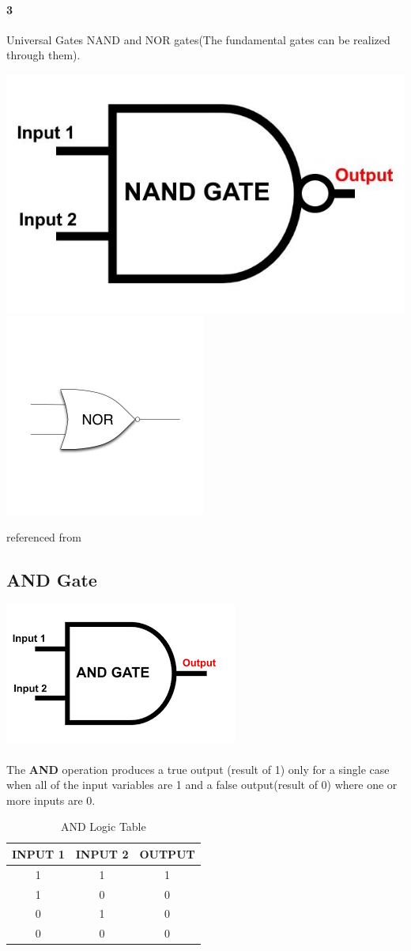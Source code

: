 \documentclass{article}
\begin{document}
		\paragraph{3}
		Universal Gates NAND and NOR gates(The fundamental gates can be realized through them).
		\begin{minipage}{\linewidth}
			\includegraphics[width = 0.36\linewidth]{nand}
			\includegraphics[width = 0.4\linewidth, height=0.23\textheight]{nor}
		\end{minipage}
referenced from~\cite{okoacha2021logicgatestypes}
\subsection{AND Gate}
	\includegraphics{and}
	\paragraph{}
		The \textbf{AND} operation produces a true output (result of 1) only for a single case when all of the input variables are 1 and a false output(result of 0) where one or more inputs are 0.
		\begin{table}[h]
			\centering
			\label{tab:table1}
			\caption{AND Logic Table}
			\begin{tabular}{|c|c|c|}
				INPUT 1 & INPUT 2 & OUTPUT\\
				\hline
				1&1&1\\
				1&0&0\\
				0&1&0\\
				0&0&0\\
			\end{tabular}
		\end{table}
		
\end{document}
